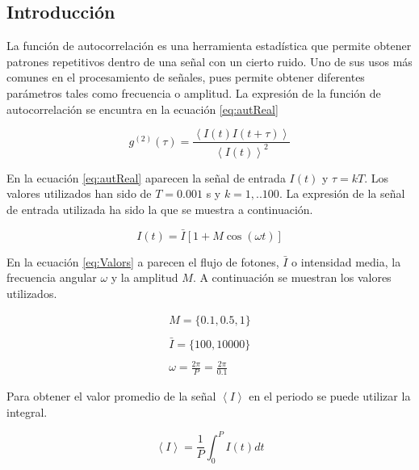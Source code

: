 \documentclass[twoside]{article}
\begin{document}
	\begin{multicols}{2} %

		\section{Introducción} %
							 
			La función de autocorrelación es una herramienta estadística que permite obtener patrones repetitivos dentro de una señal con un cierto ruido. Uno de sus usos más comunes en el procesamiento de señales, pues permite obtener diferentes parámetros tales como frecuencia o amplitud. La expresión de la función de autocorrelación se encuntra en la ecuación \ref{eq:autReal}

				\begin{equation}
					g^{(2)}(\tau) = \frac{\left< I(t)I(t+\tau)\right>}{\left< I(t)\right>^2}
					\label{eq:autReal}
				\end{equation}

			En la ecuación \ref{eq:autReal} aparecen la señal de entrada $I(t)$ y $\tau = kT$. Los valores utilizados han sido de $T = 0.001$ s y $k = {1, ..100}$. La expresión de la señal de entrada utilizada ha sido la que se muestra a continuación.

				\begin{equation}
					I(t) = \bar{I}[1+M\cos(\omega t)]
					\label{eq:Valors}
				\end{equation}

			En la ecuación \ref{eq:Valors} a parecen el flujo de fotones, $\bar{I}$ o intensidad media, la frecuencia angular $\omega$ y la amplitud $M$. A continuación se muestran los valores utilizados.

				\begin{equation}
					\begin{matrix}
					M = \{0.1, 0.5, 1\} \\ \\
					\bar{I} = \{100, 10000\} \\ \\
					\omega = \frac{2\pi}{P} = \frac{2\pi}{0.1}
					\end{matrix}
				\end{equation}

			Para obtener el valor promedio de la señal $\left<I\right>$ en el periodo se puede utilizar la integral.

				\begin{equation}
					\left<I\right> = \frac{1}{P} \int^{P}_0 I(t) dt					
					\label{eq:integ}
				\end{equation}


\end{multicols}
\end{document}
